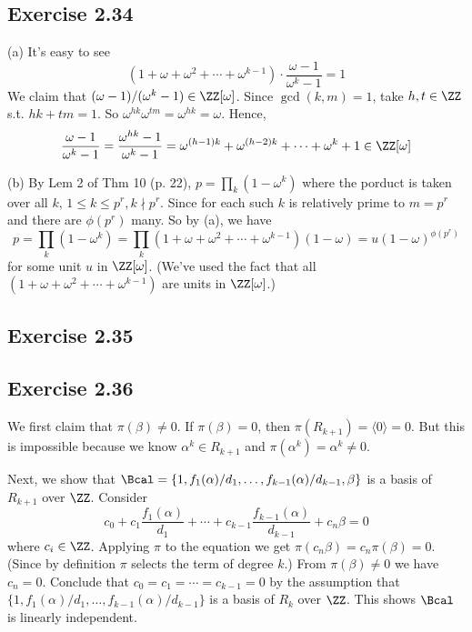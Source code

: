 \documentclass[../Chapter.tex]{subfiles}
\begin{document}
\subsection*{Exercise 2.34}

(a) It's easy to see $$\left(1+\omega+\omega^2+\cdots+\omega^{k-1}\right)\cdot\frac{\omega-1}{\omega^k-1}=1$$ We claim that $(\omega-1)/(\omega^k-1)\in\ZZ[\omega]$. Since $\gcd(k,m)=1$, take $h,t\in\ZZ$ s.t. $hk+tm=1$. So $\omega^{hk}\omega^{tm}=\omega^{hk}=\omega$. Hence, $$\frac{\omega-1}{\omega^k-1}=\frac{\omega^{hk}-1}{\omega^k-1}=\omega^{(h-1)k}+\omega^{(h-2)k}+\cdots+\omega^k+1\in\ZZ[\omega]$$

(b) By Lem 2 of Thm 10 (p. 22), $p=\prod_{k} (1-\omega^k)$ where the porduct is taken over all $k$, $1\leq k\leq p^r,k\nmid p^r$. Since for each such $k$ is relatively prime to $m=p^r$ and there are $\phi(p^r)$ many. So by (a), we have $$p=\prod_{k} (1-\omega^k)= \prod_{k}(1+\omega+\omega^2+\cdots+\omega^{k-1})(1-\omega)=u(1-\omega)^{\phi(p^r)}
$$
for some unit $u$ in $\ZZ[\omega]$. (We've used the fact that all $(1+\omega+\omega^2+\cdots+\omega^{k-1})$ are units in $\ZZ[\omega]$.)

\subsection*{Exercise 2.35}

\subsection*{Exercise 2.36}

We first claim that $\pi(\beta)\neq 0$. If $\pi(\beta)=0$, then $\pi(R_{k+1})=\langle0\rangle=0$. But this is impossible because we know $\alpha^k\in R_{k+1}$ and $\pi(\alpha^k)=\alpha^k\neq0$.

Next, we show that $\Bcal=\{1,f_1(\alpha)/d_1,\ldots,f_{k-1}(\alpha)/d_{k-1},\beta\}$ is a basis of $R_{k+1}$ over $\ZZ$. Consider $$c_0+c_1\frac{f_1(\alpha)}{d_1}+\cdots+c_{k-1}\frac{f_{k-1}(\alpha)}{d_{k-1}}+c_n\beta=0$$ where $c_i\in\ZZ$. Applying $\pi$ to the equation we get $\pi(c_n\beta)=c_n\pi(\beta)=0$. (Since by definition $\pi$ selects the term of degree $k$.) From $\pi(\beta)\neq 0$ we have $c_n=0$. Conclude that $c_0=c_1=\cdots=c_{k-1}=0$ by the assumption that $\{1,f_1(\alpha)/d_1,\ldots,f_{k-1}(\alpha)/d_{k-1}\}$ is a basis of $R_k$ over $\ZZ$. This shows $\Bcal$ is linearly independent.
\end{document}
